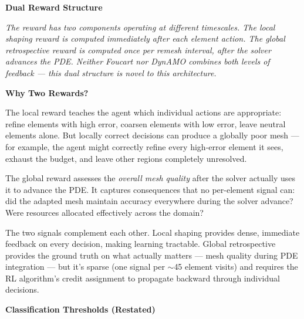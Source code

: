 \documentclass[11pt]{article}
\begin{document}
\begin{center}
{\Large\bfseries Dual Reward Structure}
\end{center}

\vspace{0.15cm}
\noindent\textit{The reward has two components operating at different timescales. The local shaping reward is computed immediately after each element action. The global retrospective reward is computed once per remesh interval, after the solver advances the PDE. Neither Foucart nor DynAMO combines both levels of feedback --- this dual structure is novel to this architecture.}

\vspace{0.5cm}
\noindent\textbf{\textcolor{solvercolor}{Why Two Rewards?}}

\vspace{0.15cm}
\noindent The local reward teaches the agent which individual actions are appropriate: refine elements with high error, coarsen elements with low error, leave neutral elements alone. But locally correct decisions can produce a globally poor mesh --- for example, the agent might correctly refine every high-error element it sees, exhaust the budget, and leave other regions completely unresolved.

The global reward assesses the \textit{overall mesh quality} after the solver actually uses it to advance the PDE. It captures consequences that no per-element signal can: did the adapted mesh maintain accuracy everywhere during the solver advance? Were resources allocated effectively across the domain?

The two signals complement each other. Local shaping provides dense, immediate feedback on every decision, making learning tractable. Global retrospective provides the ground truth on what actually matters --- mesh quality during PDE integration --- but it's sparse (one signal per $\sim$45 element visits) and requires the RL algorithm's credit assignment to propagate backward through individual decisions.

\vspace{0.5cm}
\noindent\textbf{\textcolor{solvercolor}{Classification Thresholds (Restated)}}
\end{document}
